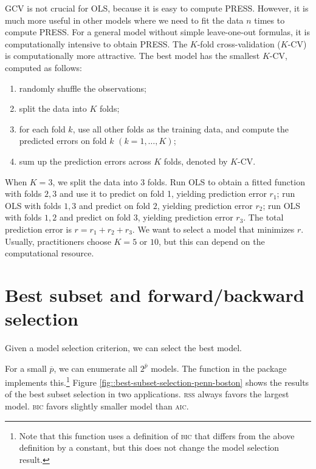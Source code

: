 GCV is not crucial for OLS, because it is easy to compute PRESS.
However, it is much more useful in other models where
we need to fit the data $n$ times to compute PRESS. 
For a general model without simple leave-one-out formulas, it is computationally intensive to obtain PRESS. The
$K$-fold cross-validation ($K$-CV) is computationally more attractive. The best model has the smallest $K$-CV, computed as follows:
\begin{enumerate}
\item randomly shuffle the observations;
\item split the data into $K$ folds;
\item for each fold $k$, use all other folds as the training data, and
compute the predicted errors on fold $k$ $(k=1,\ldots, K)$;
\item sum up the prediction errors across $K$ folds, denoted by $K$-CV.
\end{enumerate}

When $K  = 3$, we split the data into $3$ folds. Run OLS to obtain a fitted function with folds $2,3$ and use it to predict on fold 1, yielding prediction error $r_1$;  run OLS with folds $1,3$ and predict on fold $2$,  yielding prediction error $r_2$; run OLS with folds $1, 2$ and predict on fold $3$, yielding prediction error $r_3$. The total prediction error is $r = r_1  + r_2 + r_3$. We want to select a model that minimizes $r$. Usually, practitioners choose $K=5$ or $10$, but this can depend on the computational resource. 



\section{Best subset and forward/backward selection}

Given a model selection criterion, we can select the best model. 

For a small $\overline{p}$, we can enumerate all $2^{\overline{p}}$ models. The function  in the  package  implements this.\footnote{Note that this function uses a definition of \textsc{bic} that differs from the above definition by a constant, but this does not change the model selection result.}
Figure \ref{fig::best-subset-selection-penn-boston} shows the results of the best subset selection in two applications. \textsc{rss} always favors the largest model. \textsc{bic} favors slightly smaller model than \textsc{aic}.




